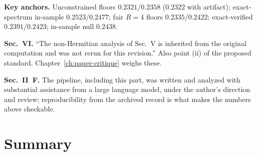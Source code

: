 \textbf{Key anchors.} Unconstrained floors $0.2321$/$0.2358$ ($0.2322$ with artifact); exact-spectrum in-sample $0.2523$/$0.2477$; fair $R=4$ floors $0.2335$/$0.2422$; exact-verified $0.2391$/$0.2423$; in-sample null $0.2438$.

\textbf{Sec.~VI.} ``The non-Hermitian analysis of Sec.~V is inherited from the original computation and was not rerun for this revision.'' Also point (ii) of the proposed standard. Chapter~\ref{ch:paper-critique} weighs these.

\textbf{Sec.~II~F.} The pipeline, including this part, was written and analyzed with substantial assistance from a large language model, under the author's direction and review; reproducibility from the archived record \cite{zenodo} is what makes the numbers above checkable.

\section{Summary}

